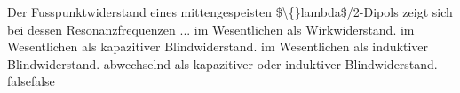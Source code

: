     {Der Fusspunktwiderstand eines mittengespeisten \$\textbackslash\{\}lambda\$/2-Dipols zeigt sich bei dessen Resonanzfrequenzen ...}
    {im Wesentlichen als Wirkwiderstand.}
    {im Wesentlichen als kapazitiver Blindwiderstand.}
    {im Wesentlichen als induktiver Blindwiderstand.}
    {abwechselnd als kapazitiver oder induktiver Blindwiderstand.}
    {false}{false}